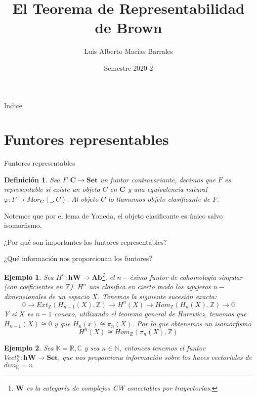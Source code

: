 \documentclass{beamer}
\title{El Teorema de Representabilidad de Brown}
\author{Luis Alberto Macías Barrales}
\institute{Instituto de Matemáticas, UNAM}
\date{Semestre 2020-2}
\newtheorem{df}{Definici\'on}
\newtheorem{ejem}{Ejemplo}
\newcommand{\con}{\mathbf{Set}}
\newcommand{\Z}{\mathbb{Z}}
\newcommand{\N}{\mathbb{N}}
\newcommand{\R}{\mathbb{R}}
\begin{document}
\begin{frame}
\titlepage
\end{frame}

\begin{frame}{Indice}
\tableofcontents
\end{frame}


\section{Funtores representables}

\begin{frame}{Funtores representables}
	\begin{df}
	Sea $F\colon \mathbf{C}\to\mathbf{Set}$ un funtor contravariante, decimos que $F$ es representable si existe un objeto $C$ en $\mathbf{C}$ y una equivalencia natural $\varphi\colon F\to Mor_\mathbf{C} (\_ ,C)$. Al objeto $C$ lo llamamos objeto clasificante de $F$.
	\end{df}
	
	Notemos que por el lema de Yoneda, el objeto clasificante es único salvo isomorfismo.
	
	¿Por qué son importantes los funtores representables?
\end{frame}


\begin{frame}{¿Qué información nos proporcionan los funtores?}
	
	\begin{ejem}
		 Sea $H^n \colon \mathbf{hW}\to \mathbf{Ab}$\footnote{$\mathbf{W}$ es la categoría de complejos CW conectables por trayectorias.}, el $n-$ésimo funtor de cohomología singular (con coeficientes en $\Z$). $H^n$ nos clasifica en cierto modo los \emph{agujeros} $n-$dimensionales de un espacio $X$. Tenemos la siguiente sucesión exacta:
			\[0 \to Ext_\Z (H_{n-1}(X),\Z)\to H^n(X) \to Hom_\Z (H_n (X),\Z)\to0\]
			Y si $X$ es $n-1$ conexo, utilizando el teorema general de Hurewicz, tenemos que $H_{n-1}(X)\cong 0$ y que $H_n (x)\cong \pi_n (X)$. Por lo que obtenemos un isomorfismo 
	\[H^n(X)\cong Hom_\Z(\pi_n(X),\Z)\]
	\end{ejem}
\end{frame}

\begin{frame}
	\begin{ejem}
		Sea $\mathbb{K}=\R, \mathbb{C}$ y sea $n\in\N$, entonces tenemos el funtor $Vect_\mathbb{K} ^n\colon \mathbf{hW}\to \con$, que nos proporciona información sobre los haces vectoriales de $dim_\mathbb{K} =n$ 
	\end{ejem}
\end{frame}
\end{document}
